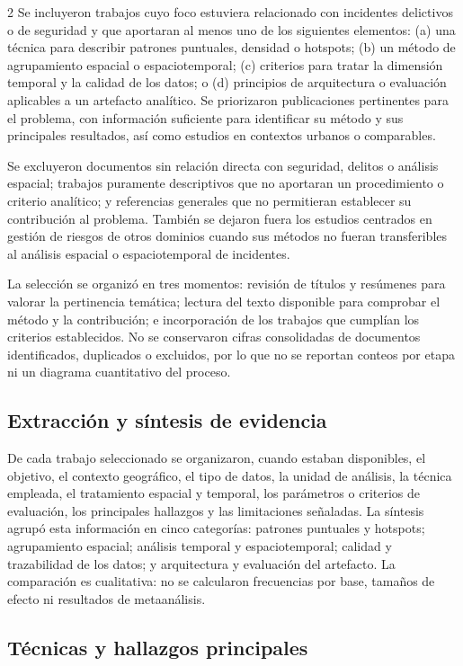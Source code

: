 \documentclass[10pt,twoside]{article}
\begin{document}
\begin{multicols}{2}
Se incluyeron trabajos cuyo foco estuviera relacionado con incidentes delictivos o de seguridad y que aportaran al menos uno de los siguientes elementos: (a) una técnica para describir patrones puntuales, densidad o hotspots; (b) un método de agrupamiento espacial o espaciotemporal; (c) criterios para tratar la dimensión temporal y la calidad de los datos; o (d) principios de arquitectura o evaluación aplicables a un artefacto analítico. Se priorizaron publicaciones pertinentes para el problema, con información suficiente para identificar su método y sus principales resultados, así como estudios en contextos urbanos o comparables.

Se excluyeron documentos sin relación directa con seguridad, delitos o análisis espacial; trabajos puramente descriptivos que no aportaran un procedimiento o criterio analítico; y referencias generales que no permitieran establecer su contribución al problema. También se dejaron fuera los estudios centrados en gestión de riesgos de otros dominios cuando sus métodos no fueran transferibles al análisis espacial o espaciotemporal de incidentes.

La selección se organizó en tres momentos: revisión de títulos y resúmenes para valorar la pertinencia temática; lectura del texto disponible para comprobar el método y la contribución; e incorporación de los trabajos que cumplían los criterios establecidos. No se conservaron cifras consolidadas de documentos identificados, duplicados o excluidos, por lo que no se reportan conteos por etapa ni un diagrama cuantitativo del proceso.

\subsection{Extracción y síntesis de evidencia}

De cada trabajo seleccionado se organizaron, cuando estaban disponibles, el objetivo, el contexto geográfico, el tipo de datos, la unidad de análisis, la técnica empleada, el tratamiento espacial y temporal, los parámetros o criterios de evaluación, los principales hallazgos y las limitaciones señaladas. La síntesis agrupó esta información en cinco categorías: patrones puntuales y hotspots; agrupamiento espacial; análisis temporal y espaciotemporal; calidad y trazabilidad de los datos; y arquitectura y evaluación del artefacto. La comparación es cualitativa: no se calcularon frecuencias por base, tamaños de efecto ni resultados de metaanálisis.

\subsection{Técnicas y hallazgos principales}


\end{multicols}
\end{document}

